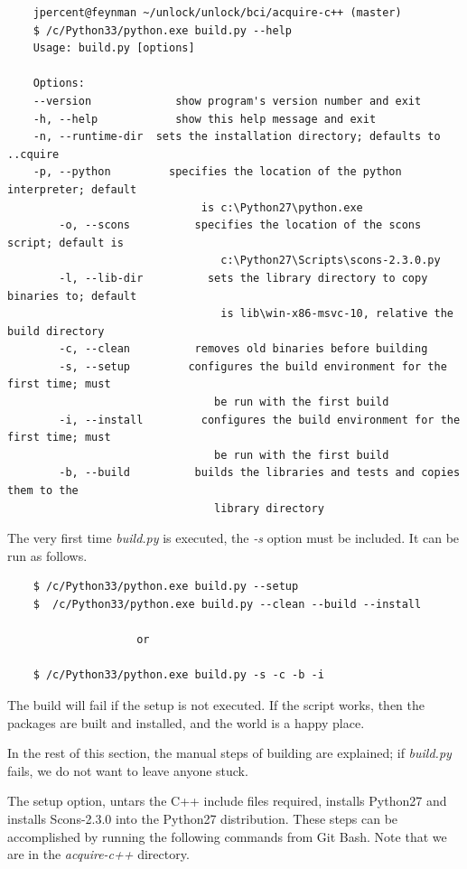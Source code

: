 \documentclass[11pt]{article}
\begin{document}
\begin{verbatim}
	jpercent@feynman ~/unlock/unlock/bci/acquire-c++ (master)
	$ /c/Python33/python.exe build.py --help
	Usage: build.py [options]

	Options:
  	--version             show program's version number and exit
  	-h, --help            show this help message and exit
  	-n, --runtime-dir  sets the installation directory; defaults to ..cquire
  	-p, --python         specifies the location of the python interpreter; default
        	                  is c:\Python27\python.exe
        -o, --scons          specifies the location of the scons script; default is
                                 c:\Python27\Scripts\scons-2.3.0.py
        -l, --lib-dir          sets the library directory to copy binaries to; default
                                 is lib\win-x86-msvc-10, relative the build directory
        -c, --clean          removes old binaries before building
        -s, --setup         configures the build environment for the first time; must
                                be run with the first build
        -i, --install         configures the build environment for the first time; must
                                be run with the first build
        -b, --build          builds the libraries and tests and copies them to the
                                library directory
\end{verbatim}

The very first time \textit{build.py} is executed, the \textit{-s} option must be included.  It can be run as follows.
\begin{verbatim}
    $ /c/Python33/python.exe build.py --setup
    $  /c/Python33/python.exe build.py --clean --build --install

                    or

    $ /c/Python33/python.exe build.py -s -c -b -i
\end{verbatim}

The build will fail if the setup is not executed.  If the script works, then the packages are built and installed, and the world is a happy place.  

In the rest of this section, the manual steps of building are explained; if \textit{build.py} fails, we do not want to leave anyone stuck.

The setup option, untars the C++ include files required, installs Python27 and installs Scons-2.3.0 into the Python27 distribution.  These steps can be accomplished by running the following commands from Git Bash.  Note that we are in the \textit{acquire-c++} directory.
\end{document}
